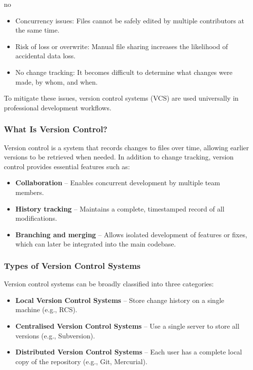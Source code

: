 no\documentclass{article}
\begin{document}
\begin{itemize}
    \item Concurrency issues: Files cannot be safely edited by multiple contributors at the same time.
    \item Risk of loss or overwrite: Manual file sharing increases the likelihood of accidental data loss.
    \item No change tracking: It becomes difficult to determine what changes were made, by whom, and when.
\end{itemize}

To mitigate these issues, version control systems (VCS) are used universally in professional development workflows.

\subsubsection{What Is Version Control?}

Version control is a system that records changes to files over time, allowing earlier versions to be retrieved when needed. In addition to change tracking, version control provides essential features such as:

\begin{itemize}
    \item \textbf{Collaboration} – Enables concurrent development by multiple team members.
    \item \textbf{History tracking} – Maintains a complete, timestamped record of all modifications.
    \item \textbf{Branching and merging} – Allows isolated development of features or fixes, which can later be integrated into the main codebase.
\end{itemize}

\subsubsection{Types of Version Control Systems}

Version control systems can be broadly classified into three categories:

\begin{itemize}
    \item \textbf{Local Version Control Systems} – Store change history on a single machine (e.g., RCS).
    \item \textbf{Centralised Version Control Systems} – Use a single server to store all versions (e.g., Subversion).
    \item \textbf{Distributed Version Control Systems} – Each user has a complete local copy of the repository (e.g., Git, Mercurial).
\end{itemize}
\end{document}
